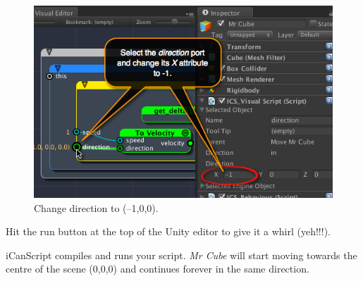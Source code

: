 \begin{figure}[htbp]
\centering
\includegraphics[keepaspectratio,width=\textwidth,height=0.75\textheight]{change-direction-value.png}
\caption{Change direction to (--1,0,0).}
\label{change-direction-value.png}
\end{figure}

Hit the run button at the top of the Unity editor to give it a whirl (yeh!!!).

iCanScript compiles and runs your script. \emph{Mr Cube} will start moving towards the centre of the scene (0,0,0) and continues forever in the same direction.


